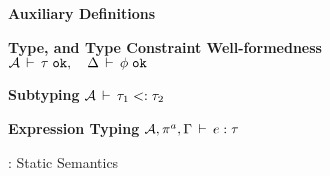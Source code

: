 \begin{figure*}[t!]
%
\textbf{Auxiliary Definitions}\\

%
\bigskip

%
\textbf{Type, and Type Constraint Well-formedness}  \; \fbox
  {\({\mathcal{A}}\,\vdash\,\tau \; \texttt{ok}, \quad 
     \Delta\,\vdash\,\phi \; \texttt{ok}\)}\\

%
\bigskip

%
\textbf{Subtyping}  \; \fbox
  {\({\mathcal{A}}\,\vdash\,\tau_1 <: \tau_2\)}\\

%
\bigskip

\textbf{Expression Typing}  \; \fbox
  {\({\mathcal{A}},\pi^a,\Gamma\,\vdash\,e:\tau\)}\\

%
\bigskip


\caption{\fbname: Static Semantics}
\label{fig:fb-staticsem}
\end{figure*}


